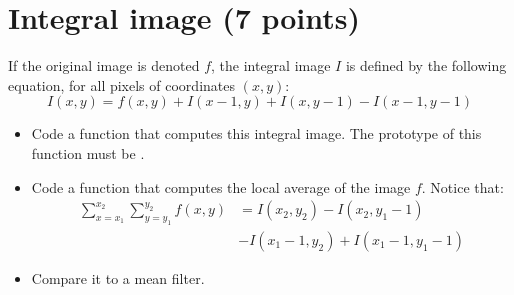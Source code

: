 % 
% 
% 
% 
% 

\section{Integral image (7 points)}
If the original image is denoted $f$, the integral image $I$ is defined by the following equation, for all pixels of coordinates $(x,y)$:
$$I(x,y)=f(x,y)+I(x-1,y)+I(x,y-1)-I(x-1,y-1)$$
	
	\begin{qbox}
	 \begin{itemize}
	  \item Code a function that computes this integral image. The prototype of this function must be .

	  \item Code a function that computes the local average of the image $f$. Notice that: 
	  \begin{equation*}
	  \begin{aligned}\sum_{x=x_1}^{x_2}\sum_{y=y_1}^{y_2}f(x,y) &= I(x_2,y_2)-I(x_2,y_1-1)\\
	  &-I(x_1-1,y_2)+I(x_1-1, y_1-1)
	  \end{aligned}
	  \end{equation*}

	  \item Compare it to a mean filter.
	 \end{itemize}

	\end{qbox}
	
